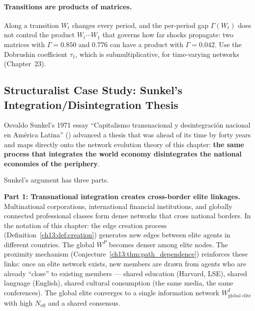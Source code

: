 \documentclass[../structural_economics_book.tex]{subfiles}
\begin{document}
\paragraph{Transitions are products of matrices.} Along a transition $W_t$ changes every period, and the per-period gap $\Gamma(W_t)$ does not control the product $W_t \cdots W_1$ that governs how far shocks propagate: two matrices with $\Gamma = 0.850$ and $0.776$ can have a product with $\Gamma = 0.042$. Use the Dobrushin coefficient $\tau_1$, which is submultiplicative, for time-varying networks (Chapter~23).


\subsection*{Structuralist Case Study: Sunkel's Integration/Disintegration Thesis}

Osvaldo Sunkel's 1971 essay ``Capitalismo transnacional y desintegraci\'{o}n nacional en Am\'{e}rica Latina'' (\citealp[\textit{Estudios Internacionales}, 4(16), pp.~3--61]{sunkel1971capitalismo}) advanced a thesis that was ahead of its time by forty years and maps directly onto the network evolution theory of this chapter: \textbf{the same process that integrates the world economy disintegrates the national economies of the periphery}.

Sunkel's argument has three parts.

\textbf{Part 1: Transnational integration creates cross-border elite linkages.} Multinational corporations, international financial institutions, and globally connected professional classes form dense networks that cross national borders. In the notation of this chapter: the edge creation process (Definition~\ref{ch13:def:creation}) generates new edges between elite agents in different countries. The global $W^P$ becomes denser among elite nodes. The proximity mechanism (Conjecture~\ref{ch13:thm:path_dependence}) reinforces these links: once an elite network exists, new members are drawn from agents who are already ``close'' to existing members --- shared education (Harvard, LSE), shared language (English), shared cultural consumption (the same media, the same conferences). The global elite converges to a single information network $W^I_{\text{global elite}}$ with high $N_{\text{eff}}$ and a shared consensus.
\end{document}
